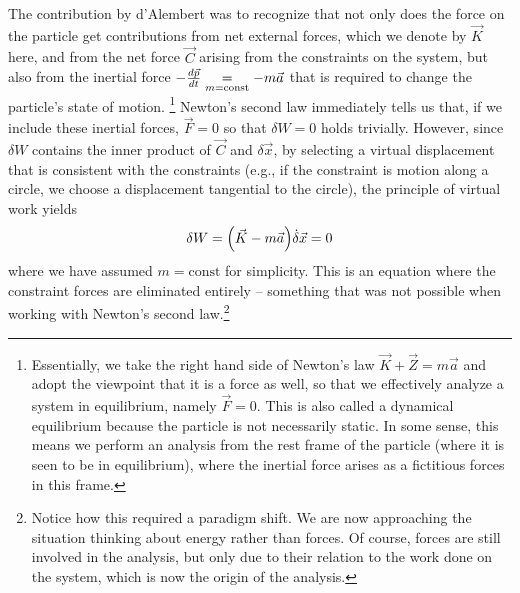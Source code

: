 \documentclass[../class_mech_main.tex]{subfiles}
\begin{document}
The contribution by d'Alembert was to recognize that not only does the force on the particle get contributions from net external forces, which we denote by $\vec{K}$ here, and from the net force $\vec{C}$ arising from the constraints on the system, but also from the inertial force $- \dv{\vec{p}}{t} \underset{m = \text{const}}{=} - m \vec{a}$ that is required to change the particle's state of motion.
\footnote{Essentially, we take the right hand side of Newton's law $\vec{K} + \vec{Z} = m \vec{a}$ and adopt the viewpoint that it is a force as well, so that we effectively analyze a system in equilibrium, namely $\vec{F} = 0$. This is also called a dynamical equilibrium because the particle is not necessarily static. In some sense, this means we perform an analysis from the rest frame of the particle (where it is seen to be in equilibrium), where the inertial force arises as a fictitious forces in this frame.}
Newton's second law immediately tells us that, if we include these inertial forces, $\vec{F} = 0$ so that $\delta W = 0$ holds trivially. However, since $\delta W$ contains the inner product of $\vec{C}$ and $\delta \vec{x}$, by selecting a virtual displacement that is consistent with the constraints (e.g., if the constraint is motion along a circle, we choose a displacement tangential to the circle), the principle of virtual work yields
\begin{equation}
	\delta W = \qty(\vec{K} - m \vec{a}) \dot \delta \vec{x} = 0
\end{equation}
where we have assumed $m = \text{const}$ for simplicity. This is an equation where the constraint forces are eliminated entirely -- something that was not possible when working with Newton's second law.\footnote{Notice how this required a paradigm shift. We are now approaching the situation thinking about energy rather than forces. Of course, forces are still involved in the analysis, but only due to their relation to the work done on the system, which is now the origin of the analysis.}

\end{document}

